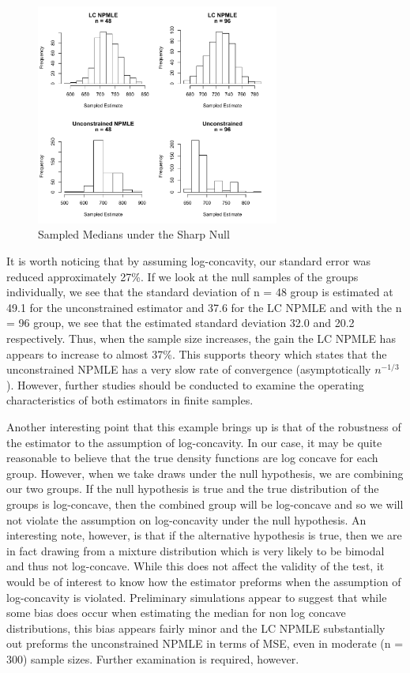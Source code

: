 \begin{figure}
\centerline{\includegraphics[width = 8cm]{MedianHist.pdf}}
\caption{Sampled Medians under the Sharp Null}
\end{figure}		

	It is worth noticing that by assuming log-concavity, our standard error was reduced approximately 27\%. If we look at the null samples of the groups individually, we see that the standard deviation of n = 48 group is estimated at 49.1 for the unconstrained estimator and 37.6 for the LC NPMLE and with the n = 96 group, we see that the estimated standard deviation 32.0 and 20.2 respectively. Thus, when the sample size increases, the gain the LC NPMLE has appears to increase to almost 37\%. This supports theory which states that the unconstrained NPMLE has a very slow rate of convergence (asymptotically $n^{-1/3}$). However, further studies should be conducted to examine the operating characteristics of both estimators in finite samples.
	
	Another interesting point that this example brings up is that of the robustness of the estimator to the assumption of log-concavity. In our case, it may be quite reasonable to believe that the true density functions are log concave for each group. However, when we take draws under the null hypothesis, we are combining our two groups. If the null hypothesis is true and the true distribution of the groups is log-concave, then the combined group will be log-concave and so we will not violate the assumption on log-concavity under the null hypothesis. An interesting note, however, is that if the alternative hypothesis is true, then we are in fact drawing from a mixture distribution which is very likely to be bimodal and thus not log-concave. While this does not affect the validity of the test, it would be of interest to know how the estimator preforms when the assumption of log-concavity is violated. Preliminary simulations appear to suggest that while some bias does occur when estimating the median for non log concave distributions, this bias appears fairly minor and the LC NPMLE substantially out preforms the unconstrained NPMLE in terms of MSE, even in moderate (n = 300) sample sizes. Further examination is required, however.
